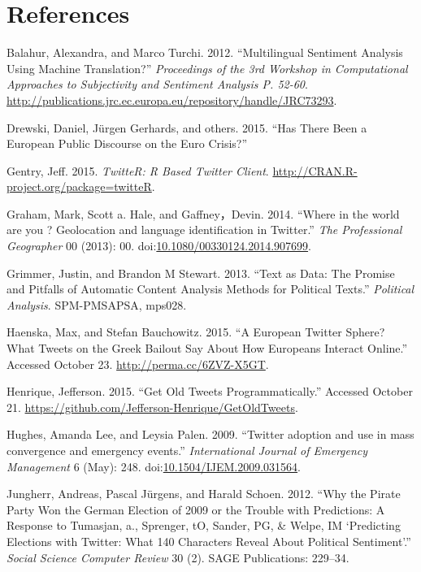 \documentclass[]{article}
\begin{document}
\section*{References}\label{references}

Balahur, Alexandra, and Marco Turchi. 2012. ``Multilingual Sentiment
Analysis Using Machine Translation?'' \emph{Proceedings of the 3rd
Workshop in Computational Approaches to Subjectivity and Sentiment
Analysis P. 52-60}.
\url{http://publications.jrc.ec.europa.eu/repository/handle/JRC73293}.

Drewski, Daniel, J{ü}rgen Gerhards, and others. 2015. ``Has There Been a
European Public Discourse on the Euro Crisis?''

Gentry, Jeff. 2015. \emph{TwitteR: R Based Twitter Client}.
\url{http://CRAN.R-project.org/package=twitteR}.

Graham, Mark, Scott a. Hale, and Gaffney，Devin. 2014. ``Where in the
world are you ? Geolocation and language identification in Twitter.''
\emph{The Professional Geographer} 00 (2013): 00.
doi:\href{http://dx.doi.org/10.1080/00330124.2014.907699}{10.1080/00330124.2014.907699}.

Grimmer, Justin, and Brandon M Stewart. 2013. ``Text as Data: The
Promise and Pitfalls of Automatic Content Analysis Methods for Political
Texts.'' \emph{Political Analysis}. SPM-PMSAPSA, mps028.

Haenska, Max, and Stefan Bauchowitz. 2015. ``A European Twitter Sphere?
What Tweets on the Greek Bailout Say About How Europeans Interact
Online.'' Accessed October 23. \url{http://perma.cc/6ZVZ-X5GT}.

Henrique, Jefferson. 2015. ``Get Old Tweets Programmatically.'' Accessed
October 21. \url{https://github.com/Jefferson-Henrique/GetOldTweets}.

Hughes, Amanda Lee, and Leysia Palen. 2009. ``Twitter adoption and use
in mass convergence and emergency events.'' \emph{International Journal
of Emergency Management} 6 (May): 248.
doi:\href{http://dx.doi.org/10.1504/IJEM.2009.031564}{10.1504/IJEM.2009.031564}.

Jungherr, Andreas, Pascal J{ü}rgens, and Harald Schoen. 2012. ``Why the
Pirate Party Won the German Election of 2009 or the Trouble with
Predictions: A Response to Tumasjan, a., Sprenger, tO, Sander, PG, \&
Welpe, IM `Predicting Elections with Twitter: What 140 Characters Reveal
About Political Sentiment'.'' \emph{Social Science Computer Review} 30
(2). SAGE Publications: 229--34.
\end{document}
